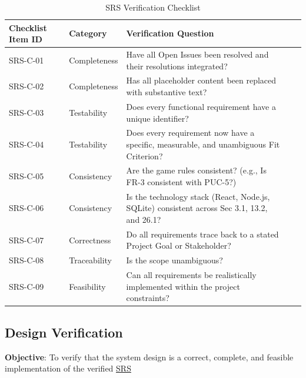 \documentclass[12pt, titlepage]{article}
\begin{document}
\begin{table}[H]
\centering
\caption{SRS Verification Checklist}
\label{tab:srs-checklist}
\begin{tabular}{|l|l|p{}|l|l|}
\hline
\textbf{Checklist Item ID} & \textbf{Category} & \textbf{Verification Question} \\ \hline
SRS-C-01 & Completeness & Have all Open Issues been resolved and their resolutions integrated?  \\ \hline
SRS-C-02 & Completeness & Has all placeholder content been replaced with substantive text? \\ \hline
SRS-C-03 & Testability & Does every functional requirement have a unique identifier? \\ \hline
SRS-C-04 & Testability & Does every requirement now have a specific, measurable, and unambiguous Fit Criterion? \\ \hline
SRS-C-05 & Consistency & Are the game rules consistent? (e.g., Is FR-3 consistent with PUC-5?)  \\ \hline
SRS-C-06 & Consistency & Is the technology stack (React, Node.js, SQLite) consistent across Sec 3.1, 13.2, and 26.1? \\ \hline
SRS-C-07 & Correctness & Do all requirements trace back to a stated Project Goal or Stakeholder? \\ \hline
SRS-C-08 & Traceability & Is the scope unambiguous? \\ \hline
SRS-C-09 & Feasibility & Can all requirements be realistically implemented within the project constraints? \\ \hline
\end{tabular}
\end{table}


\subsection{Design Verification}
\noindent \textbf{Objective}: To verify that the system design is a correct, complete, and feasible implementation of the verified \href{../SRS/SRS.pdf}{SRS}
\end{document}
